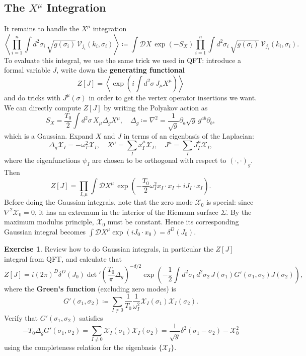 \documentclass{report}
\theoremstyle{plain}
\theoremstyle{definition}
\newtheorem{exercise}{Exercise}[section]
\theoremstyle{remark}
\newcommand{\di}{\partial}
\newcommand{\cD}{\mathcal{D}}
\newcommand{\cV}{\mathcal{V}}
\newcommand{\cX}{\mathcal{X}}
\begin{document}
\subsection{The $X^\mu$ Integration}

It remains to handle the $X^\mu$ integration
\[ \left\langle \prod_{i=1}^n \int d^2\sigma_i \, \sqrt{g(\sigma_i)} \, \cV_{j_i}(k_i, \sigma_i) \right\rangle \coloneqq \int \cD X \, \exp(-S_X) \prod_{i=1}^n \int d^2\sigma_i \, \sqrt{g(\sigma_i)} \, \cV_{j_i}(k_i, \sigma_i). \]
To evaluate this integral, we use the same trick we used in QFT:
introduce a formal variable $J$, write down the {\bf generating
  functional}
\[ Z[J] = \left\langle \exp\left(i\int d^2\sigma \, J_\mu X^\mu\right) \right\rangle \]
and do tricks with $J^\mu(\sigma)$ in order to get the vertex operator
insertions we want. We can directly compute $Z[J]$ by writing the
Polyakov action as
\[ S_X = \frac{T_0}{2} \int d^2\sigma \, X_\mu \Delta_g X^\mu, \quad \Delta_g \coloneqq \nabla^2 = \frac{1}{\sqrt{g}} \di_a \sqrt{g} \, g^{ab} \di_b, \]
which is a Gaussian. Expand $X$ and $J$ in terms of an eigenbasis of
the Laplacian:
\[ \Delta_g \cX_I = -\omega_I^2 \cX_I, \quad X^\mu = \sum_I x_I^\mu \cX_I, \quad J^\mu = \sum_I J_I^\mu \cX_I, \]
where the eigenfunctions $\psi_I$ are chosen to be orthogonal with
respect to $(\cdot, \cdot)_g$. Then
\[ Z[J] = \prod_{I,\mu} \int \cD X^\mu \, \exp\left(-\frac{T_0}{2} \omega_I^2 x_I \cdot x_I + iJ_I \cdot x_I\right). \]
Before doing the Gaussian integrals, note that the zero mode $\cX_0$
is special: since $\nabla^2 \cX_0 = 0$, it has an extremum in the
interior of the Riemann surface $\Sigma$. By the maximum modulus
principle, $\cX_0$ must be constant. Hence its corresponding Gaussian
integral becomes $\int \cD X^\mu \exp(iJ_0 \cdot x_0) =
\delta^D(J_0)$.

\begin{exercise}
  Review how to do Gaussian integrals, in particular the $Z[J]$
  integral from QFT, and calculate that
  \[ Z[J] = i(2\pi)^D \delta^D(J_0) \det\nolimits' \left(\frac{T_0}{\pi}\Delta_g\right)^{-d/2} \exp\left(-\frac{1}{2} \int d^2 \sigma_1 \, d^2\sigma_2 \, J(\sigma_1) G'(\sigma_1, \sigma_2) J(\sigma_2)\right), \]
  where the {\bf Green's function} (excluding zero modes) is
  \[ G'(\sigma_1, \sigma_2) \coloneqq \sum_{I \neq 0} \frac{1}{T_0} \frac{1}{\omega_I^2} \cX_I(\sigma_1) \cX_I(\sigma_2). \]
  Verify that $G'(\sigma_1, \sigma_2)$ satisfies
  \[ -T_0 \Delta_g G'(\sigma_1, \sigma_2) = \sum_{I \neq 0} \cX_I(\sigma_1) \cX_I(\sigma_2) = \frac{1}{\sqrt{g}} \delta^2(\sigma_1 - \sigma_2) - \cX_0^2 \]
  using the completeness relation for the eigenbasis $\{\cX_I\}$.
\end{exercise}
\end{document}

